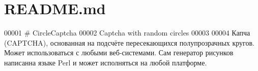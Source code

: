 \hypertarget{_r_e_a_d_m_e_8md_source}{}\section{R\+E\+A\+D\+M\+E.\+md}

\begin{DoxyCode}
00001 # CircleCaptcha
00002 Captcha with random circles
00003 
00004 Капча (CAPTCHA), основанная на подсчёте пересекающихся полупрозрачных кругов. Может использоваться с
       любыми веб-системами. Сам генератор рисунков написанна языке Perl и может исполняться на любой платформе.
\end{DoxyCode}
